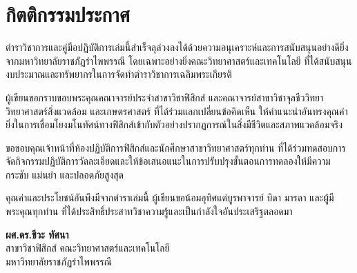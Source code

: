 \chapter*{กิตติกรรมประกาศ}

ตำราวิชาการและคู่มือปฏิบัติการเล่มนี้สำเร็จลุล่วงลงได้ด้วยความอนุเคราะห์และการสนับสนุนอย่างดียิ่งจากมหาวิทยาลัยราชภัฏรำไพพรรณี โดยเฉพาะอย่างยิ่งคณะวิทยาศาสตร์และเทคโนโลยี ที่ได้สนับสนุนงบประมาณและทรัพยากรในการจัดทำตำราวิชาการเฉลิมพระเกียรติ

ผู้เขียนขอกราบขอบพระคุณคณาจารย์ประจำสาขาวิชาฟิสิกส์ และคณาจารย์สาขาวิชาจุลชีววิทยา วิทยาศาสตร์สิ่งแวดล้อม และเกษตรศาสตร์ ที่ได้ร่วมแลกเปลี่ยนข้อคิดเห็น ให้คำแนะนำอันทรงคุณค่ายิ่งในการเชื่อมโยงมโนทัศน์ทางฟิสิกส์เข้ากับตัวอย่างปรากฏการณ์ในสิ่งมีชีวิตและสภาพแวดล้อมจริง

ขอขอบคุณเจ้าหน้าที่ห้องปฏิบัติการฟิสิกส์และนักศึกษาสาขาวิทยาศาสตร์ทุกท่าน ที่ได้ร่วมทดสอบการจัดกิจกรรมปฏิบัติการวัดละเอียดและให้ข้อเสนอแนะในการปรับปรุงขั้นตอนการทดลองให้มีความกระชับ แม่นยำ และปลอดภัยสูงสุด

คุณค่าและประโยชน์อันพึงมีจากตำราเล่มนี้ ผู้เขียนขอน้อมอุทิศแด่บูรพาจารย์ บิดา มารดา และผู้มีพระคุณทุกท่าน ที่ได้ประสิทธิ์ประสาทวิชาความรู้และเป็นกำลังใจอันประเสริฐตลอดมา

\vspace{1.5cm}
\begin{flushright}
    \textbf{ผศ.ดร.ชีวะ ทัศนา}\\[0.2cm]
    สาขาวิชาฟิสิกส์ คณะวิทยาศาสตร์และเทคโนโลยี\\
    มหาวิทยาลัยราชภัฏรำไพพรรณี
\end{flushright}
